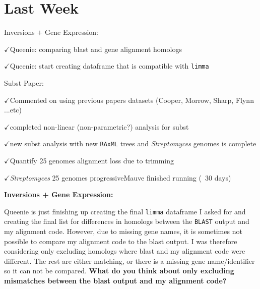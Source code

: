 \documentclass[12pt]{article}
\newcommand{\p}{progressiveMauve\xspace}
\newcommand{\strep}{\textit{Streptomyces}\xspace}
\newcommand{\ch}{$\checkmark$}
\begin{document}

	
\section*{Last Week}

Inversions $+$ Gene Expression:

\ch Queenie: comparing blast and gene alignment homologs

\ch Queenie: start creating dataframe that is compatible with \texttt{limma}

Subst Paper:

\ch Commented on using previous papers datasets (Cooper, Morrow, Sharp, Flynn ...etc)

\ch completed non-linear (non-parametric?) analysis for subst

\ch new subst analysis with new \texttt{RAxML} trees and \strep genomes is complete

\ch Quantify 25 genomes alignment loss due to trimming

\ch \strep 25 genomes \p finished running (~30 days)







\textbf{Inversions + Gene Expression:}

Queenie is just finishing up creating the final \texttt{limma} dataframe I asked for and creating the final list for differences in homologs between the \texttt{BLAST} output and my alignment code.
However, due to missing gene names, it is sometimes not possible to compare my alignment code to the blast output.
I was therefore considering only excluding homologs where blast and my alignment code were different.
The rest are either matching, or there is a missing gene name/identifier so it can not be compared.
\textbf{What do you think about only excluding mismatches between the blast output and my alignment code?}
\end{document}
